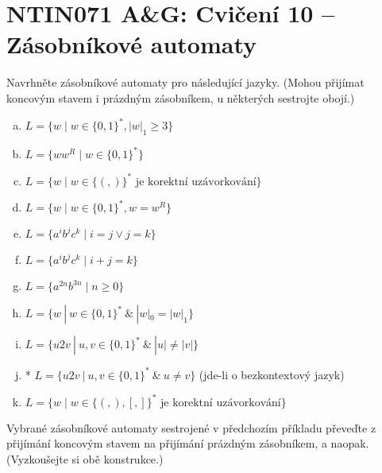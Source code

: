 \documentclass[a4paper,12pt]{amsart}
\begin{document}
\thispagestyle{empty}

\section*{NTIN071 A\&G: Cvičení 10 -- Zásobníkové automaty}


\medskip


\medskip

\medskip\begin{problem}

    Navrhněte zásobníkové automaty pro následující jazyky. (Mohou přijímat koncovým stavem i prázdným zásobníkem, u některých sestrojte obojí.)

    \bigskip
    \begin{enumerate}[(a)]\setlength\itemsep{12pt}
        \item $L=\{w\mid w\in\{0,1\}^*,|w|_1\geq 3\}$
        \item $L=\{ww^R\mid w\in \{0,1\}^*\}$
        \item $L=\{w\mid w\in\{(,)\}^*\text{ je korektní uzávorkování}\}$
        \item $L=\{w\mid w\in \{0,1\}^*,w=w^R\}$
        \item $L=\{a^ib^jc^k\mid i=j \vee j=k\} $
        \item $L=\{a^ib^jc^k\mid i+j=k\}$
        \item $L=\{a^{2n}b^{3n}\mid n\geq 0\}$
        \item $L=\{w\ |\ w\in \{0,1\}^*\ \&\  |w|_0=|w|_1\} $
        \item $L=\{u2v\ |\ u,v\in \{0,1\}^*\ \&\  |u|\neq |v|\} $
        \item* $L=\{u2v\ |\ u,v\in \{0,1\}^*\ \&\  u\neq v\} $ (jde-li o bezkontextový jazyk)
        \item $L=\{w\mid w\in\{(,),[,]\}^*\text{ je korektní uzávorkování}\}$     
    \end{enumerate}

\end{problem}


\medskip\begin{problem}

    Vybrané zásobníkové automaty sestrojené v předchozím příkladu převeďte z přijímání koncovým stavem na přijímání prázdným zásobníkem, a naopak. (Vyzkoušejte si obě konstrukce.)

\end{problem}
\end{document}
